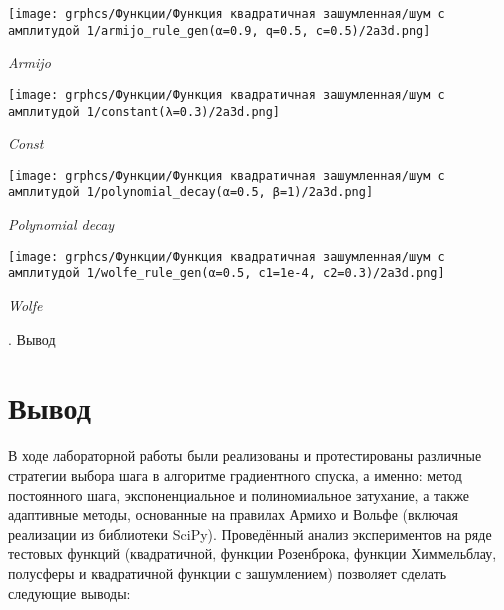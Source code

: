 \documentclass{article}
\begin{document}
\begin{center}
    \texttt{[image: grphcs/Функции/Функция квадратичная зашумленная/шум с амплитудой 1/armijo\_rule\_gen(α=0.9, q=0.5, c=0.5)/2a3d.png]}

    { \it Armijo}
\end{center}

\begin{center}
    \texttt{[image: grphcs/Функции/Функция квадратичная зашумленная/шум с амплитудой 1/constant(λ=0.3)/2a3d.png]}

    { \it Const}
\end{center}

\begin{center}
    \texttt{[image: grphcs/Функции/Функция квадратичная зашумленная/шум с амплитудой 1/polynomial\_decay(α=0.5, β=1)/2a3d.png]}

    { \it Polynomial decay}
\end{center}

\begin{center}
    \texttt{[image: grphcs/Функции/Функция квадратичная зашумленная/шум с амплитудой 1/wolfe\_rule\_gen(α=0.5, c1=1e-4, c2=0.3)/2a3d.png]}

    { \it Wolfe}
\end{center}

\begin{center}
    {. Вывод}
\end{center}

\section*{Вывод}
В ходе лабораторной работы были реализованы и протестированы различные стратегии выбора шага в алгоритме градиентного спуска, а именно: метод постоянного шага, экспоненциальное и полиномиальное затухание, а также адаптивные методы, основанные на правилах Армихо и Вольфе (включая реализации из библиотеки SciPy). Проведённый анализ экспериментов на ряде тестовых функций (квадратичной, функции Розенброка, функции Химмельблау, полусферы и квадратичной функции с зашумлением) позволяет сделать следующие выводы:
\end{document}
